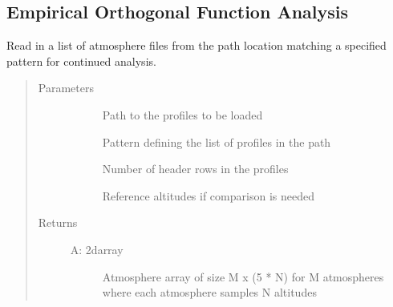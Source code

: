 \documentclass[letterpaper,10pt,english]{sphinxmanual}
\begin{document}
\subsection{Empirical Orthogonal Function Analysis}
\label{\detokenize{stochprop.eofs:empirical-orthogonal-function-analysis}}\label{\detokenize{stochprop.eofs::doc}}\label{\detokenize{stochprop.eofs:module-stochprop.eofs}}

\begin{fulllineitems}
\label{\detokenize{stochprop.eofs:stochprop.eofs.build_atmo_matrix}}
Read in a list of atmosphere files from the path location
matching a specified pattern for continued analysis.
\begin{quote}\begin{description}
\item[{Parameters}] \leavevmode\begin{description}
\item[{}] \leavevmode
Path to the profiles to be loaded

\item[{}] \leavevmode
Pattern defining the list of profiles in the path

\item[{}] \leavevmode
Number of header rows in the profiles

\item[{}] \leavevmode
Reference altitudes if comparison is needed

\end{description}

\item[{Returns}] \leavevmode\begin{description}
\item[{A: 2darray}] \leavevmode
Atmosphere array of size M x (5 * N) for M atmospheres where each atmosphere samples N altitudes

\end{description}

\end{description}\end{quote}

\end{fulllineitems}
\end{document}
